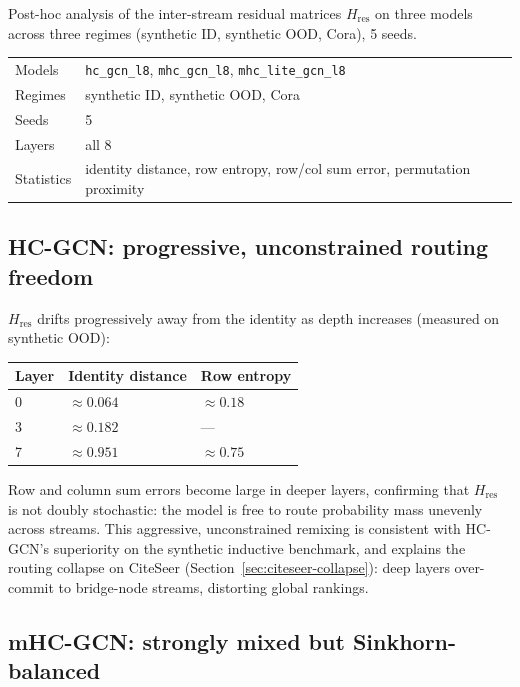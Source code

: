 \documentclass[11pt,a4paper]{article}
\begin{document}
Post-hoc analysis of the inter-stream residual matrices $H_\text{res}$
on three models across three regimes (synthetic ID, synthetic OOD,
Cora), 5 seeds.

\begin{table}[h]
\centering
\begin{tabular}{L{4cm} L{7cm}}
\toprule
Models & \texttt{hc\_gcn\_l8}, \texttt{mhc\_gcn\_l8},
         \texttt{mhc\_lite\_gcn\_l8} \\
Regimes & synthetic ID, synthetic OOD, Cora \\
Seeds & 5 \\
Layers & all 8 \\
Statistics & identity distance, row entropy,
             row/col sum error, permutation proximity \\
\bottomrule
\end{tabular}
\end{table}

\subsection{HC-GCN: progressive, unconstrained routing freedom}

$H_\text{res}$ drifts progressively away from the identity
as depth increases (measured on synthetic OOD):

\begin{table}[h]
\centering
\begin{tabular}{C{2.5cm} R{3.5cm} R{3.5cm}}
\toprule
Layer & Identity distance & Row entropy \\
 & $\approx 0.064$ & $\approx 0.18$ \\
3 & $\approx 0.182$ & --- \\
7 & $\approx 0.951$ & $\approx 0.75$ \\
\bottomrule
\end{tabular}
\end{table}

Row and column sum errors become large in deeper layers,
confirming that $H_\text{res}$ is not doubly stochastic:
the model is free to route probability mass unevenly across streams.
This aggressive, unconstrained remixing is consistent with
HC-GCN's superiority on the synthetic inductive benchmark,
and explains the routing collapse on CiteSeer
(Section~\ref{sec:citeseer-collapse}):
deep layers over-commit to bridge-node streams, distorting global rankings.

\subsection{mHC-GCN: strongly mixed but Sinkhorn-balanced}
\end{document}
